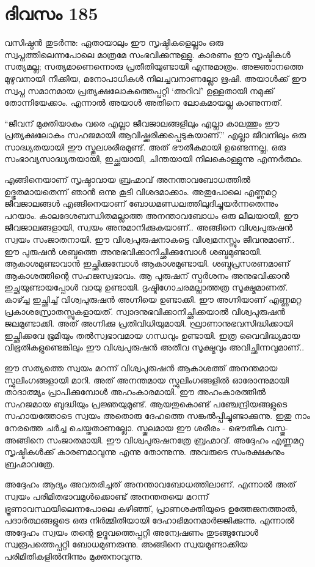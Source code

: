 \section{ദിവസം 185}


വസിഷ്ഠൻ തുടർന്നു: ഏതായാലും ഈ സൃഷ്ടികളെല്ലാം ഒരു സ്വപ്നത്തിലെന്നപോലെ മാത്രമേ സംഭവിക്കുന്നുള്ളു. കാരണം ഈ സൃഷ്ടികൾ സത്യമല്ല; സത്യമാണെന്നൊരു പ്രതീതിയുണ്ടായി എന്നുമാത്രം. അജ്ഞാനത്തെ മുഴുവനായി നീക്കിയ, മനോപാധികൾ നിലച്ചവനാണല്ലോ  ഋഷി. അയാൾക്ക് ഈ സ്വപ്ന സമാനമായ പ്രത്യക്ഷലോകത്തെപ്പറ്റി ‘അറിവ്’ ഉള്ളതായി നമുക്ക് തോന്നിയേക്കാം. എന്നാൽ അയാൾ അതിനെ ലോകമായല്ല കാണുന്നത്.

“ജീവന്‌ മുക്തിയാകും വരെ എല്ലാ ജീവജാലങ്ങളിലും എല്ലാ കാലത്തും ഈ പ്രത്യക്ഷലോകം സഹജമായി ആവിഷ്ക്കരിക്കപ്പെടുകയാണ്‌.” എല്ലാ ജീവനിലും ഒരു സാദ്ധ്യതയായി ഈ സ്തൂലശരീരമുണ്ട്. അത് ഭൗതീകമായി ഉണ്ടെന്നല്ല, ഒരു സംഭാവ്യസാദ്ധ്യതയായി, ഇച്ഛയായി, ചിന്തയായി നിലകൊള്ളുന്നു എന്നർത്ഥം.

എങ്ങിനെയാണ്‌ സൃഷ്ടാവായ ബ്രഹ്മാവ് അനന്താവബോധത്തിൽ ഉദ്ഭൂതമായതെന്ന് ഞാൻ ഒന്നു കൂടി വിശദമാക്കാം. അതുപോലെ എണ്ണമറ്റ ജീവജാലങ്ങൾ എങ്ങിനെയാണ്‌ ബോധമണ്ഡലത്തിലുദിച്ചുയർന്നതെന്നും പറയാം. കാലദേശബന്ധിതമല്ലാത്ത അനന്താവബോധം ഒരു ലീലയായി, ഈ ജീവജാലങ്ങളായി, സ്വയം അനുമാനിക്കുകയാണ്‌.. അങ്ങിനെ വിശ്വപുരുഷന്‍ സ്വയം സംജാതനായി. ഈ വിശ്വപുരുഷനാകട്ടെ വിശ്വമനസ്സും ജീവനുമാണ്‌.. ഈ പുരുഷൻ ശബ്ദത്തെ അനുഭവിക്കാനിച്ഛിക്കുമ്പോൾ ശബ്ദമുണ്ടായി. ആകാശമുണ്ടാവാൻ ഇച്ഛിക്കുമ്പോൾ ആകാശമുണ്ടായി. ശബ്ദപ്രസരണമാണ്‌ ആകാശത്തിന്റെ സഹജസ്വഭാവം. ആ പുരുഷന്‌ സ്പർശനം അനുഭവിക്കാൻ ഇച്ഛയുണ്ടായപ്പോള്‍ വായു ഉണ്ടായി. ദൃഷ്ടിഗോചരമല്ലാത്തത്ര സൂക്ഷ്മമാണത്. കാഴ്ച്ച ഇച്ഛിച്ച് വിശ്വപുരുഷൻ അഗ്നിയെ ഉണ്ടാക്കി. ഈ അഗ്നിയാണ്‌ എണ്ണമറ്റ പ്രകാശസ്രോതസ്സുകളായത്. സ്വാദനുഭവിക്കാനിച്ഛിക്കയാൽ വിശ്വപുരുഷൻ ജലമുണ്ടാക്കി. അത് അഗ്നിക്കു പ്രതിവിധിയുമായി. ഘ്രാണാനുഭവസിദ്ധിക്കായി ഇച്ഛിക്കവേ ഭൂമിയും തൽസ്വഭാവമായ ഗന്ധവും ഉണ്ടായി. ഇത്ര വൈവിദ്ധ്യമായ വിഭൂതികളുണ്ടെങ്കിലും ഈ വിശ്വപുരുഷൻ അതീവ സൂക്ഷ്മവും അവിച്ഛിന്നവുമാണ്‌..

ഈ സത്യത്തെ സ്വയം മറന്ന് വിശ്വപുരുഷൻ ആകാശത്ത് അനന്തമായ സ്ഫുലിംഗങ്ങളായി മാറി. അത് അനന്തമായ സ്ഫുലിംഗങ്ങളിൽ ഓരോന്നുമായി താദാത്മ്യം പ്രാപിക്കുമ്പോൾ അഹംകാരമായി. ഈ അഹംകാരത്തിൽ സഹജമായ ബുദ്ധിയും പ്രജ്ഞയുമുണ്ട്. ആയതുകൊണ്ട് പഞ്ചേന്ദ്രിയങ്ങളുടെ സഹായത്തോടെ സ്വയം അതൊരു ദേഹത്തെ സങ്കൽപ്പിച്ചുണ്ടാക്കുന്നു. ഇതു നാം നേരത്തെ ചർച്ച ചെയ്തതാണല്ലോ. സ്തൂലമായ ഈ ശരീരം  - ഭൌതീക വസ്തു- അങ്ങിനെ സംജാതമായി. ഈ വിശ്വപുരുഷനത്രേ ബ്രഹ്മാവ്. അദ്ദേഹം എണ്ണമറ്റ സൃഷ്ടികൾക്ക് കാരണമാവുന്നു എന്നു തോന്നുന്നു. അവരുടെ സംരക്ഷകനും ബ്രഹ്മാവത്രേ.

അദ്ദേഹം ആദ്യം അവതരിച്ചത് അനന്താവബോധത്തിലാണ്‌. എന്നാൽ അത് സ്വയം പരിമിതഭാവമുൾക്കൊണ്ട് അനന്തതയെ മറന്ന് ഭ്രൂണാവസ്ഥയിലെന്നപോലെ കഴിഞ്ഞ്, പ്രാണശക്തിയുടെ ഉത്തേജനത്താൽ, പദാർത്ഥങ്ങളുടെ ഒരു നിർമ്മിതിയായി ദേഹാഭിമാനമാർജ്ജിക്കുന്നു. എന്നാൽ അദ്ദേഹം സ്വയം തന്റെ ഉദ്ഭവത്തെപ്പറ്റി അന്വേഷണം തുടങ്ങുമ്പോൾ സ്വരൂപത്തെപ്പറ്റി ബോധമുണരുന്നു. അങ്ങിനെ സ്വയമുണ്ടാക്കിയ പരിമിതികളിൽനിന്നും മുക്തനാവുന്നു. 
